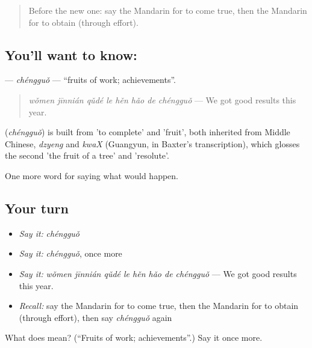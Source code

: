 \label{lesson:ZH-C395-chengguo}



\begin{quote}
Before the new one: say the Mandarin for to come true, then the Mandarin for to obtain (through effort).
\end{quote}

\subsection*{You'll want to know: }
\textbf{} — \emph{chéngguǒ} — \textquotedblleft{}fruits of work; achievements\textquotedblright{}.

\begin{quote}
\textbf{} \emph{wǒmen jīnnián qǔdé le hěn hǎo de chéngguǒ} — We got good results this year.
\end{quote}

\begin{cousinweb}
\textbf{} (\emph{chéngguǒ}) is built from  'to complete' and  'fruit', both inherited from Middle Chinese, \emph{dzyeng} and \emph{kwaX} (Guangyun, in Baxter's transcription), which glosses the second 'the fruit of a tree' and 'resolute'.
\end{cousinweb}

\begin{grammarlens}[title={What you've built}]
One more word for saying what would happen.
\end{grammarlens}

\subsection*{Your turn}
\begin{itemize}
\raggedright
  \item \emph{Say it:} \emph{chéngguǒ}
  \item \emph{Say it:} \emph{chéngguǒ}, once more
  \item \emph{Say it:} \emph{wǒmen jīnnián qǔdé le hěn hǎo de chéngguǒ} — We got good results this year.
  \item \emph{Recall:} say the Mandarin for to come true, then the Mandarin for to obtain (through effort), then say \emph{chéngguǒ} again
\end{itemize}

\begin{tcolorbox}[breakable,colback=teal!4,colframe=teal!35!black,title={Before you move on}]
What does  mean? (\textquotedblleft{}Fruits of work; achievements\textquotedblright{}.) Say it once more.
\end{tcolorbox}
